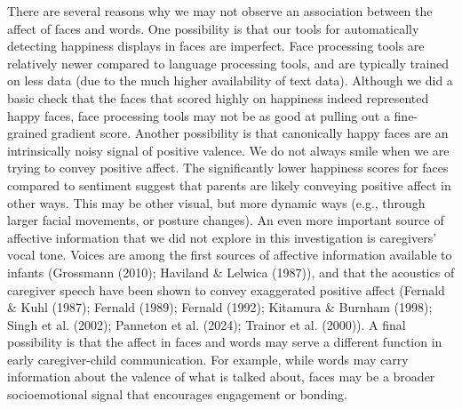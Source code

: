 \documentclass[10pt, letterpaper]{article}
\begin{document}
There are several reasons why we may not observe an association between
the affect of faces and words. One possibility is that our tools for
automatically detecting happiness displays in faces are imperfect. Face
processing tools are relatively newer compared to language processing
tools, and are typically trained on less data (due to the much higher
availability of text data). Although we did a basic check that the faces
that scored highly on happiness indeed represented happy faces, face
processing tools may not be as good at pulling out a fine-grained
gradient score. Another possibility is that canonically happy faces are
an intrinsically noisy signal of positive valence. We do not always
smile when we are trying to convey positive affect. The significantly
lower happiness scores for faces compared to sentiment suggest that
parents are likely conveying positive affect in other ways. This may be
other visual, but more dynamic ways (e.g., through larger facial
movements, or posture changes). An even more important source of
affective information that we did not explore in this investigation is
caregivers' vocal tone. Voices are among the first sources of affective
information available to infants (Grossmann (2010); Haviland \& Lelwica
(1987)), and that the acoustics of caregiver speech have been shown to
convey exaggerated positive affect (Fernald \& Kuhl (1987); Fernald
(1989); Fernald (1992); Kitamura \& Burnham (1998); Singh et al. (2002);
Panneton et al. (2024); Trainor et al. (2000)). A final possibility is
that the affect in faces and words may serve a different function in
early caregiver-child communication. For example, while words may carry
information about the valence of what is talked about, faces may be a
broader socioemotional signal that encourages engagement or bonding.
\end{document}

